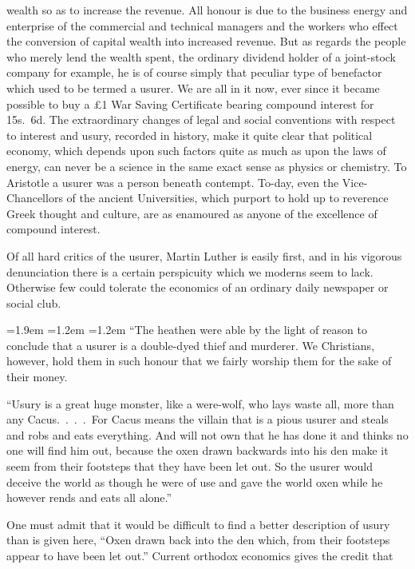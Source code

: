 \documentclass[10.5pt,twoside]{book}
\newenvironment{extract}
  {\par\addvspace{7pt}\begingroup\small\linespread{1.02}\selectfont
   \leftskip=1.9em \rightskip=1.2em \parindent=1.2em \noindent\ignorespaces}
  {\par\endgroup\addvspace{7pt}}
\newcommand{\origpage}[1]{\clearpage\setcounter{page}{#1}}
\begin{document}
\origpage{26}

\noindent wealth so as to increase the revenue. All honour is due to the
business energy and enterprise of the commercial and technical managers and
the workers who effect the conversion of capital wealth into increased
revenue. But as regards the people who merely lend the wealth spent, the
ordinary dividend holder of a joint-stock company for example, he is of course
simply that peculiar type of benefactor which used to be termed a usurer. We
are all in it now, ever since it became possible to buy a \pounds1 War Saving
Certificate bearing compound interest for 15s.\ 6d. The extraordinary changes
of legal and social conventions with respect to interest and usury, recorded
in history, make it quite clear that political economy, which depends upon
such factors quite as much as upon the laws of energy, can never be a science
in the same exact sense as physics or chemistry. To Aristotle a usurer was a
person beneath contempt. To-day, even the Vice-Chancellors of the ancient
Universities, which purport to hold up to reverence Greek thought and culture,
are as enamoured as anyone of the excellence of compound interest.

Of all hard critics of the usurer, Martin Luther is easily first, and in his
vigorous denunciation there is a certain perspicuity which we moderns seem to
lack. Otherwise few could tolerate the economics of an ordinary daily
newspaper or social club.

\begin{extract}
``The heathen were able by the light of reason to conclude that a usurer is a
double-dyed thief and murderer. We Christians, however, hold them in such
honour that we fairly worship them for the sake of their money.

``Usury is a great huge monster, like a were-wolf, who lays waste all, more
than any Cacus.\ .\ .\ .\ For Cacus means the villain that is a pious usurer
and steals and robs and eats everything. And will not own that he has done it
and thinks no one will find him out, because the oxen drawn backwards into his
den make it seem from their footsteps that they have been let out. So the
usurer would deceive the world as though he were of use and gave the world
oxen while he however rends and eats all alone.''
\end{extract}

One must admit that it would be difficult to find a better description of
usury than is given here, ``Oxen drawn back into the den which, from their
footsteps appear to have been let out.'' Current orthodox economics gives the
credit that
\end{document}
